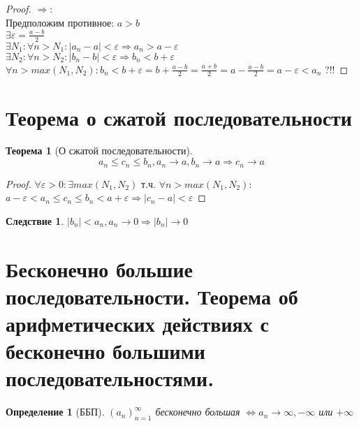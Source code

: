 \documentclass[12pt, a4]{article}
\newtheorem*{theorem}{Теорема}
\newtheorem*{corollary}{Следствие}
\newtheorem*{definition}{Определение}
\renewcommand{\implies}{\Rightarrow}
\renewcommand{\iff}{\Leftrightarrow}
\renewcommand{\epsilon}{\varepsilon}
\begin{document}
\begin{proof}
$\implies:$\\
Предположим противное: $a > b$\\
$\exists \epsilon = \frac{a-b}{2}$\\
$\exists N_1: \forall n > N_1: |a_n - a| <
\epsilon \implies a_n > a - \epsilon $\\
$\exists N_2: \forall n > N_2: |b_n - b| <
\epsilon \implies b_n < b + \epsilon $\\
$\forall n > max(N_1, N_2): b_n<b+\epsilon=b+\frac{a-b}{2}=\frac{a+b}{2}=a-\frac{a-b}{2}=a-\epsilon<a_n$ ?!!
\end{proof}

\section{Теорема о сжатой последовательности}

\begin{theorem}[О сжатой последовательности]
\[a_n \leq c_n \leq b_n, a_n \to a, b_n \to a \implies c_n \to a\]
\end{theorem}

\begin{proof}
$\forall \epsilon > 0: \exists max(N_1, N_2)$ т.ч. $\forall n > max(N_1, N_2):$\\
$ a-\epsilon < a_n \leq c_n \leq b_n < a + \epsilon \implies |c_n - a| < \epsilon$
\end{proof}

\begin{corollary}
$|b_n| < a_n, a_n \to 0 \implies |b_n| \to 0$
\end{corollary}

\section{Бесконечно большие последовательности. Теорема об арифметических действиях с бесконечно большими последовательностями.}

\begin{definition}[ББП]
$(a_n)_{n=1}^\infty$ бесконечно большая $\iff a_n \to \infty, -\infty$ или $+\infty$
\end{definition}
\end{document}
